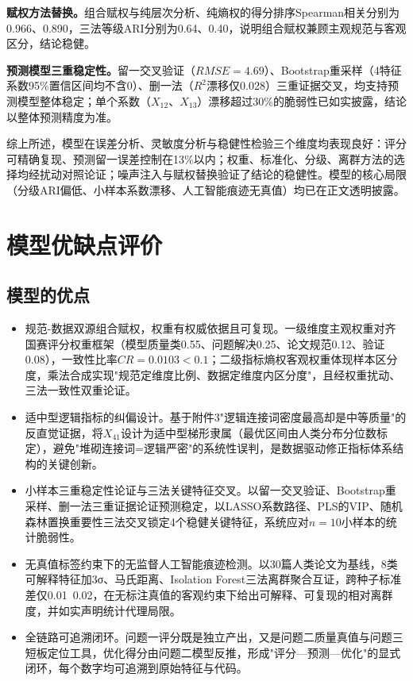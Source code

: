 \documentclass[withoutpreface]{cumcmthesis}
\begin{document}
\textbf{赋权方法替换。}组合赋权与纯层次分析、纯熵权的得分排序Spearman相关分别为0.966、0.890，三法等级ARI分别为0.64、0.40，说明组合赋权兼顾主观规范与客观区分，结论稳健。

\textbf{预测模型三重稳定性。}留一交叉验证（$RMSE=4.69$）、Bootstrap重采样（4特征系数95\%置信区间均不含0）、删一法（$R^2$漂移仅0.028）三重证据交叉，均支持预测模型整体稳定；单个系数（$X_{12}$、$X_{13}$）漂移超过30\%的脆弱性已如实披露，结论以整体预测精度为准。

综上所述，模型在误差分析、灵敏度分析与稳健性检验三个维度均表现良好：评分可精确复现、预测留一误差控制在13\%以内；权重、标准化、分级、离群方法的选择均经扰动对照论证；噪声注入与赋权替换验证了结论的稳健性。模型的核心局限（分级ARI偏低、小样本系数漂移、人工智能痕迹无真值）均已在正文透明披露。

\section{模型优缺点评价}
\subsection{模型的优点}
\begin{itemize}
  \item 规范-数据双源组合赋权，权重有权威依据且可复现。一级维度主观权重对齐国赛评分权重框架（模型质量类0.55、问题解决0.25、论文规范0.12、验证0.08），一致性比率$CR=0.0103<0.1$；二级指标熵权客观权重体现样本区分度，乘法合成实现"规范定维度比例、数据定维度内区分度"，且经权重扰动、三法一致性双重论证。
  \item 适中型逻辑指标的纠偏设计。基于附件3"逻辑连接词密度最高却是中等质量"的反直觉证据，将$X_{41}$设计为适中型梯形隶属（最优区间由人类分布分位数标定），避免"堆砌连接词=逻辑严密"的系统性误判，是数据驱动修正指标体系结构的关键创新。
  \item 小样本三重稳定性论证与三法关键特征交叉。以留一交叉验证、Bootstrap重采样、删一法三重证据论证预测稳定，以LASSO系数路径、PLS的VIP、随机森林置换重要性三法交叉锁定4个稳健关键特征，系统应对$n=10$小样本的统计脆弱性。
  \item 无真值标签约束下的无监督人工智能痕迹检测。以30篇人类论文为基线，8类可解释特征加3σ、马氏距离、Isolation Forest三法离群聚合互证，跨种子标准差仅0.01~0.02，在无标注真值的客观约束下给出可解释、可复现的相对离群度，并如实声明统计代理局限。
  \item 全链路可追溯闭环。问题一评分既是独立产出，又是问题二质量真值与问题三短板定位工具，优化得分由问题二模型反推，形成"评分—预测—优化"的显式闭环，每个数字均可追溯到原始特征与代码。
\end{itemize}
\end{document}
